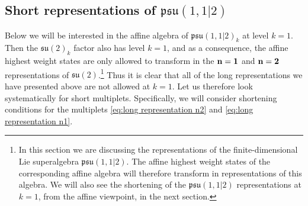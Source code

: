 \documentclass[12pt,a4paper]{article}
\begin{document}
\subsection{Short representations of $\mathfrak{psu}(1,1|2)$} \label{subsec:short representations psu112}

Below we will be interested in the affine algebra of $\mathfrak{psu}(1,1|2)_k$ at level $k=1$. Then the 
$\mathfrak{su}(2)_k$ factor also has level $k=1$, and as a consequence, the affine highest weight states are only allowed to transform in the ${\bf n}={\bf 1}$ and ${\bf n}={\bf 2}$ representations of $\mathfrak{su}(2)$.\footnote{In this section we are discussing the representations of the finite-dimensional Lie superalgebra $\mathfrak{psu}(1,1|2)$. The affine highest weight states of the corresponding affine algebra will therefore transform in representations of this algebra. We will also see the shortening of the  $\mathfrak{psu}(1,1|2)$ representations at $k=1$, from the affine viewpoint, in the next section.} Thus it is clear that all of the long representations we have presented above are not allowed at $k=1$. Let us therefore look systematically for short multiplets. Specifically, we will consider shortening conditions for the multiplets \eqref{eq:long representation n2} and \eqref{eq:long representation n1}.
\end{document}
